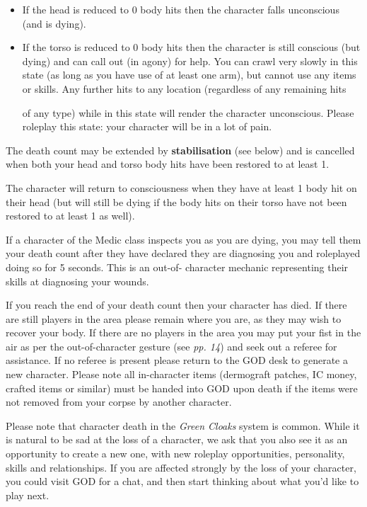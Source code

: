 \begin{itemize}
\item If the head is reduced to 0 body hits then the character falls unconscious (and is dying).

\item If the torso is reduced to 0 body hits then the character is still conscious (but dying) and can call out (in agony) for help. You can crawl very slowly in this state (as long as you have use of at least one arm), but cannot use any items or skills. Any further hits to any location (regardless of any remaining hits

of any type) while in this state will render the character unconscious. Please roleplay this state: your character will be in a lot of pain.

\end{itemize}
The death count may be extended by \textbf{stabilisation} (see below) and is cancelled when both your head and torso body hits have been restored to at least 1.

The character will return to consciousness when they have at least 1 body hit on their head (but will still be dying if the body hits on their torso have not been restored to at least 1 as well).

If a character of the Medic class inspects you as you are dying, you may tell them your death count after they have declared they are diagnosing you and roleplayed doing so for 5 seconds. This is an out-of- character mechanic representing their skills at diagnosing your wounds.

If you reach the end of your death count then your character has died. If there are still players in the area please remain where you are, as they may wish to recover your body. If there are no players in the area you may put your fist in the air as per the out-of-character gesture (see \textit{pp. 14}) and seek out a referee for assistance. If no referee is present please return to the GOD desk to generate a new character. Please note all in-character items (dermograft patches, IC money, crafted items or similar) must be handed into GOD upon death if the items were not removed from your corpse by another character.

Please note that character death in the \textit{Green Cloaks} system is common. While it is natural to be sad at the loss of a character, we ask that you also see it as an opportunity to create a new one, with new roleplay opportunities, personality, skills and relationships. If you are affected strongly by the loss of your character, you could visit GOD for a chat, and then start thinking about what you'd like to play next.

